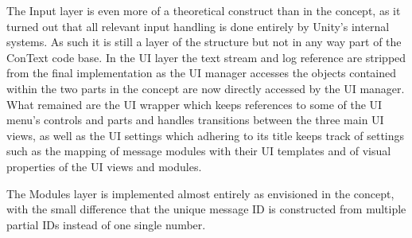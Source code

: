 The Input layer is even more of a theoretical construct than in the concept, as it turned out that all relevant input handling is done entirely by Unity's internal systems. As such it is still a layer of the structure but not in any way part of the ConText code base.
In the UI layer the text stream and log reference are stripped from the final implementation as the UI manager accesses the objects contained within the two parts in the concept are now directly accessed by the UI manager. What remained are the UI wrapper which keeps references to some of the UI menu's controls and parts and handles transitions between the three main UI views, as well as the UI settings which adhering to its title keeps track of settings such as the mapping of message modules with their UI templates and of visual properties of the UI views and modules. 

The Modules layer is implemented almost entirely as envisioned in the concept, with the small difference that the unique message ID is constructed from multiple partial IDs instead of one single number.
